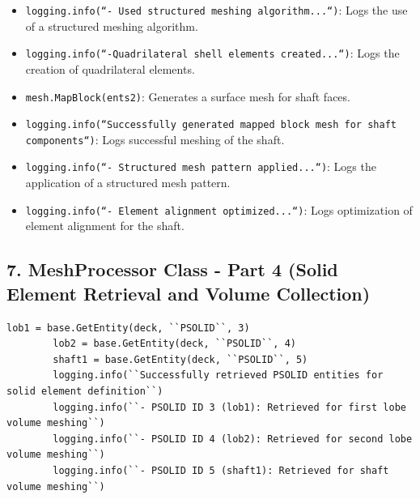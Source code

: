 \documentclass{book}
\begin{document}
\begin{itemize}[leftmargin=*,label=\textbullet]
\begin{itemize}
    \item \texttt{logging.info(``- Used structured meshing algorithm...``)}: Logs the use of a structured meshing algorithm.
    \item \texttt{logging.info(``-Quadrilateral shell elements created...``)}: Logs the creation of quadrilateral elements.
    \item \texttt{mesh.MapBlock(ents2)}: Generates a surface mesh for shaft faces.
    \item \texttt{logging.info(``Successfully generated mapped block mesh for shaft components``)}: Logs successful meshing of the shaft.
    \item \texttt{logging.info(``- Structured mesh pattern applied...``)}: Logs the application of a structured mesh pattern.
    \item \texttt{logging.info(``- Element alignment optimized...``)}: Logs optimization of element alignment for the shaft.
\end{itemize}

\subsection*{7. MeshProcessor Class - Part 4 (Solid Element Retrieval and Volume Collection)}
\begin{lstlisting}[caption={MeshProcessor Class - Solid Element Retrieval},label={lst:meshprocessor_4}]
        lob1 = base.GetEntity(deck, ``PSOLID``, 3)
        lob2 = base.GetEntity(deck, ``PSOLID``, 4)
        shaft1 = base.GetEntity(deck, ``PSOLID``, 5)
        logging.info(``Successfully retrieved PSOLID entities for solid element definition``)
        logging.info(``- PSOLID ID 3 (lob1): Retrieved for first lobe volume meshing``)
        logging.info(``- PSOLID ID 4 (lob2): Retrieved for second lobe volume meshing``)
        logging.info(``- PSOLID ID 5 (shaft1): Retrieved for shaft volume meshing``)


\end{lstlisting}
\end{itemize}
\end{document}
